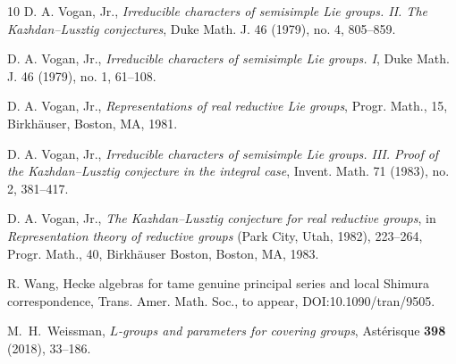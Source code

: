 \documentclass{amsart}
\theoremstyle{definition}
\begin{document}
\begin{thebibliography}{10}
D. A. Vogan, Jr.,
\emph{Irreducible characters of semisimple Lie groups. II. The
Kazhdan--Lusztig conjectures},
Duke Math. J. 46 (1979), no. 4, 805--859.

D. A. Vogan, Jr.,
\emph{Irreducible characters of semisimple Lie groups. I},
Duke Math. J. 46 (1979), no. 1, 61--108.

D. A. Vogan, Jr.,
\emph{Representations of real reductive Lie groups},
Progr. Math., 15,
Birkh\"auser, Boston, MA, 1981.

D. A. Vogan, Jr.,
\emph{Irreducible characters of semisimple Lie groups. III. Proof of the
Kazhdan--Lusztig conjecture in the integral case},
Invent. Math. 71 (1983), no. 2, 381--417.

D. A. Vogan, Jr.,
\emph{The Kazhdan--Lusztig conjecture for real reductive groups},
in \emph{Representation theory of reductive groups}
(Park City, Utah, 1982), 223--264,
Progr. Math., 40,
Birkh\"auser Boston, Boston, MA, 1983.



 R. Wang, Hecke algebras for tame genuine principal series and
local Shimura correspondence, Trans. Amer. Math. Soc., to appear,
DOI:10.1090/tran/9505.

M.~H.~Weissman,
\emph{\(L\)-groups and parameters for covering groups},
Ast\'erisque \textbf{398} (2018), 33--186.

\end{thebibliography}
\end{document}
